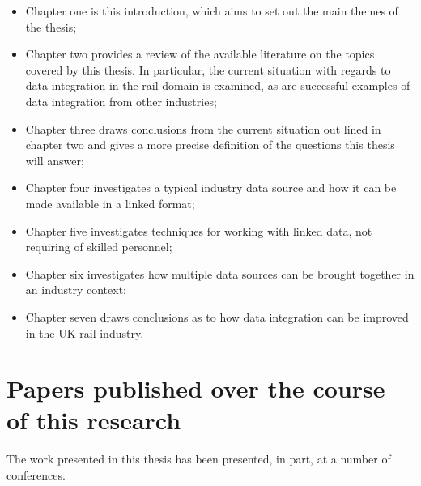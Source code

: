 \begin{itemize}
	\item Chapter one is this introduction, which aims to set out the main themes of the thesis;
	\item Chapter two provides a review of the available literature on the topics covered by this thesis. In particular, the current situation with regards to data integration in the rail domain is examined, as are successful examples of data integration from other industries;
	\item Chapter three draws conclusions from the current situation out lined in chapter two and gives a more precise definition of the questions this thesis will answer;
	\item Chapter four investigates a typical industry data source and how it can be made available in a linked format;
	\item Chapter five investigates techniques for working with linked data, not requiring of skilled personnel;
	\item Chapter six investigates how multiple data sources can be brought together in an industry context;
	\item Chapter seven draws conclusions as to how data integration can be improved in the UK rail industry.
\end{itemize}

\section{Papers published over the course of this research}

The work presented in this thesis has been presented, in part, at a number of conferences.

